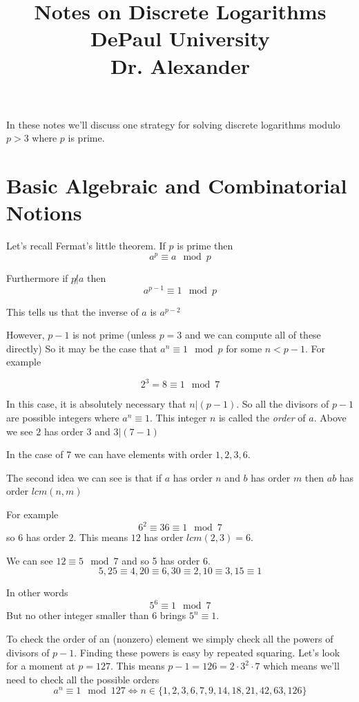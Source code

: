 \documentclass[16 pt]{amsart}
\theoremstyle{definition}
\theoremstyle{remark}
\numberwithin{equation}{subsection}
\begin{document}
\title{Notes on Discrete Logarithms \\ DePaul University\\Dr. Alexander}
\maketitle


In these notes we'll discuss one strategy for solving discrete logarithms modulo $p>3$ where $p$ is prime.

\section*{Basic Algebraic and Combinatorial Notions}

Let's recall Fermat's little theorem.  If $p$ is prime then
\[
a^p \equiv a \mod{p}
\]

Furthermore if $p\not| a$ then
\[
a^{p-1} \equiv 1 \mod{p}
\]

This tells us that the inverse of $a$ is $a^{p-2}$

However, $p-1$ is not prime (unless $p=3$ and we can compute all of these directly) So it may be the case that $a^{n}\equiv 1 \mod{p}$ for some $n<p-1$.  For example

\[
2^3 = 8 \equiv 1 \mod{7}
\]

In this case, it is absolutely necessary that $n|(p-1)$.  So all the divisors of $p-1$ are possible integers where $a^n\equiv 1$.  This integer $n$ is called the \emph{order} of $a$.  Above we see $2$ has order $3$ and $3| (7-1)$

In the case of 7 we can have elements with order $1,2,3,6$.

The second idea we can see is that if $a$ has order $n$ and $b$ has order $m$ then $ab$ has order $lcm(n,m)$

For example
\[
6^2 \equiv 36 \equiv 1 \mod{7}
\]
so $6$ has order $2$.  This means $12$ has order $lcm(2,3)=6$.

We can see $12\equiv 5\mod{7}$ and so 5 has order 6.
\[
5,25\equiv 4, 20\equiv 6,30 \equiv 2, 10 \equiv 3, 15\equiv 1
\]

In other words
\[
5^6 \equiv 1 \mod{7}
\]
But no other integer smaller than 6 brings $5^n \equiv 1$.


To check the order of an (nonzero) element we simply check all the powers of divisors of $p-1$.  Finding these powers is easy by repeated squaring.  Let's look for a moment at $p=127$. This means $p-1 = 126 = 2\cdot 3^2 \cdot 7$ which means we'll need to check all the possible orders
\[
a^n \equiv 1 \mod{127} \iff n \in \{1,2,3,6,7,9,14,18,21,42,63,126\}
\]
\end{document}
